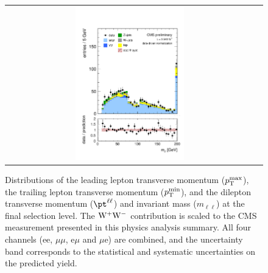 \begin{figure}[h!]
\begin{center}
\begin{tabular}{cc}
     \includegraphics[width=0.45\textwidth]{figures/mll}\\

\end{tabular}
 \caption{Distributions of the leading lepton transverse momentum ($p_{\rm T}^{\rm max}$),
the trailing lepton transverse momentum ($p_{\rm T}^{\rm min}$), and
the dilepton transverse momentum ($\pt^{\ell\ell}$) and invariant mass ($m_{\ell\ell}$)
at the final selection level. The $\mathrm{W}^+\mathrm{W}^-$ contribution is scaled to the CMS measurement
presented in this physics analysis summary.
All four channels (ee, $\mu\mu$, e$\mu$ and $\mu$e) are combined, and the uncertainty band corresponds
to the statistical and systematic uncertainties on the predicted yield.
 \label{fig:distributions}}
 \end{center}
\end{figure}
